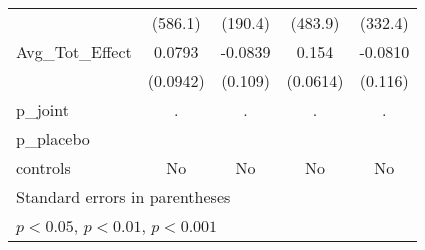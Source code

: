 {\begin{tabular}{l*{4}{c}}
            &     (586.1)         &     (190.4)         &     (483.9)         &     (332.4)         \\
\addlinespace
Avg\_Tot\_Effect&      0.0793         &     -0.0839         &       0.154\sym{*}  &     -0.0810         \\
            &    (0.0942)         &     (0.109)         &    (0.0614)         &     (0.116)         \\
\midrule
p\_joint     &           .         &           .         &           .         &           .         \\
p\_placebo   &                     &                     &                     &                     \\
controls    &          No         &          No         &          No         &          No         \\
\bottomrule
\multicolumn{5}{l}{\footnotesize Standard errors in parentheses}\\
\multicolumn{5}{l}{\footnotesize \sym{*} \(p<0.05\), \sym{**} \(p<0.01\), \sym{***} \(p<0.001\)}\\
\end{tabular}
}
